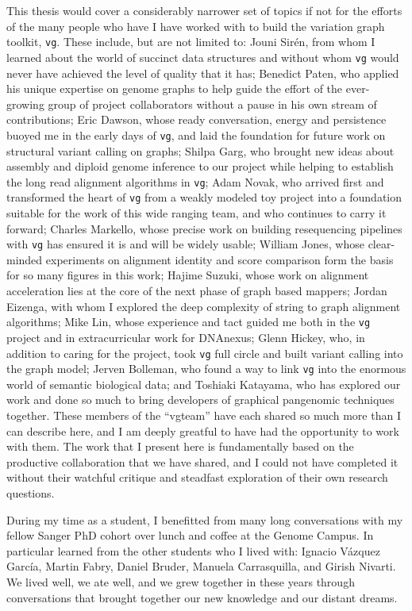 \begin{acknowledgements}
  This thesis would cover a considerably narrower set of topics if not for the efforts of the many people who have I have worked with to build the variation graph toolkit, {\tt vg}.
  These include, but are not limited to:
  Jouni Sir\'{e}n, from whom I learned about the world of succinct data structures and without whom {\tt vg} would never have achieved the level of quality that it has;
  Benedict Paten, who applied his unique expertise on genome graphs to help guide the effort of the ever-growing group of project collaborators without a pause in his own stream of contributions;
  Eric Dawson, whose ready conversation, energy and persistence buoyed me in the early days of {\tt vg}, and laid the foundation for future work on structural variant calling on graphs;
  Shilpa Garg, who brought new ideas about assembly and diploid genome inference to our project while helping to establish the long read alignment algorithms in {\tt vg};
  Adam Novak, who arrived first and transformed the heart of {\tt vg} from a weakly modeled toy project into a foundation suitable for the work of this wide ranging team, and who continues to carry it forward;
  Charles Markello, whose precise work on building resequencing pipelines with {\tt vg} has ensured it is and will be widely usable;
  William Jones, whose clear-minded experiments on alignment identity and score comparison form the basis for so many figures in this work;
  Hajime Suzuki, whose work on alignment acceleration lies at the core of the next phase of graph based mappers;
  Jordan Eizenga, with whom I explored the deep complexity of string to graph alignment algorithms;
  Mike Lin, whose experience and tact guided me both in the {\tt vg} project and in extracurricular work for DNAnexus;
  Glenn Hickey, who, in addition to caring for the project, took {\tt vg} full circle and built variant calling into the graph model;
  Jerven Bolleman, who found a way to link {\tt vg} into the enormous world of semantic biological data;
  and Toshiaki Katayama, who has explored our work and done so much to bring developers of graphical pangenomic techniques together.
  These members of the ``vgteam'' have each shared so much more than I can describe here, and I am deeply greatful to have had the opportunity to work with them.
  The work that I present here is fundamentally based on the productive collaboration that we have shared, and I could not have completed it without their watchful critique and steadfast exploration of their own research questions.

  During my time as a student, I benefitted from many long conversations with my fellow Sanger PhD cohort over lunch and coffee at the Genome Campus.
  In particular learned from the other students who I lived with: Ignacio V\'{a}zquez Garc\'{i}a, Martin Fabry, Daniel Bruder, Manuela Carrasquilla, and Girish Nivarti.
  We lived well, we ate well, and we grew together in these years through conversations that brought together our new knowledge and our distant dreams.


\end{acknowledgements}
